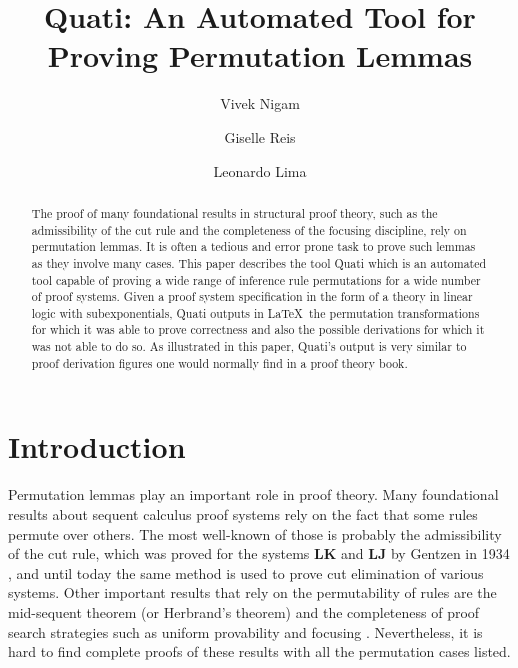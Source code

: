 \documentclass{llncs}
\title{Quati: An Automated Tool for Proving Permutation Lemmas}
\author{Vivek Nigam\inst{1} \and Giselle Reis\inst{2} \and Leonardo Lima\inst{1}}
\institute{Universidade Federal da Para\'{i}ba, Brazil
\and Technische Universit\"{a}t Wien, Austria
}
\begin{document}
\maketitle

\begin{abstract}
The proof of many foundational results in structural proof theory, such as the
admissibility of the cut rule and the completeness of the focusing discipline,
rely on permutation lemmas. It is often a tedious and error prone task to prove
such lemmas as they involve many cases. This paper describes the tool Quati
which is an automated tool capable of proving a wide range of inference rule
permutations for a wide number of proof systems. Given a proof system
specification in the form of a theory in linear logic with subexponentials,
Quati outputs in \LaTeX\ the permutation transformations for which it was able
to prove correctness and also the 
possible derivations for which it was not able to do so. As illustrated in this
paper, Quati's output is very similar to proof derivation figures one would
normally find in a proof theory book. 
\end{abstract}

\section{Introduction}

Permutation lemmas play an important role in proof theory. Many foundational
results about sequent calculus proof systems rely on the fact that some rules
permute over others. The most well-known of those is probably the admissibility of
the cut rule, which was proved for the systems \textbf{LK} and \textbf{LJ} by
Gentzen in 1934 \cite{gentzen}, and until today the same method is used to prove
cut elimination of various systems. Other important results that rely on the
permutability of rules are the mid-sequent theorem (or Herbrand's theorem)
\cite{herbrand} and the completeness of proof search strategies such as uniform
provability \cite{} and focusing \cite{andreoli}. Nevertheless, it is hard to
find complete proofs of these results with all the permutation cases listed.
\end{document}
